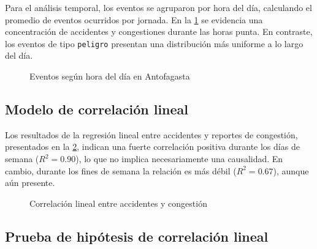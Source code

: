 \documentclass[12pt]{article}
\begin{document}
Para el análisis temporal, los eventos se agruparon por hora del día, calculando el promedio de eventos ocurridos por jornada. En la \cref{fig:time_events} se evidencia una concentración de accidentes y congestiones durante las horas punta. En contraste, los eventos de tipo \texttt{peligro} presentan una distribución más uniforme a lo largo del día.

\begin{figure}[H]
    \centering
    \newline
    \newline
    \newline
    \caption{Eventos según hora del día en Antofagasta}
    \label{fig:time_events}
\end{figure}

\subsection{Modelo de correlación lineal}

Los resultados de la regresión lineal entre accidentes y reportes de congestión, presentados en la \cref{fig:corr_lineal}, indican una fuerte correlación positiva durante los días de semana ($R^2 = 0.90$), lo que no implica necesariamente una causalidad. En cambio, durante los fines de semana la relación es más débil ($R^2 = 0.67$), aunque aún presente.


\begin{figure}[H]
    \centering
    \newline
    \newline
    \caption{Correlación lineal entre accidentes y congestión}
    \label{fig:corr_lineal}
\end{figure}

\subsection{Prueba de hipótesis de correlación lineal}
\end{document}
